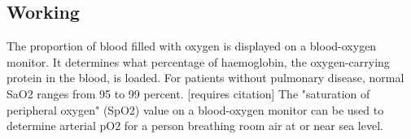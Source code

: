 \documentclass[12pt]{article}
\begin{document}
\subsection{Working}
The proportion of blood filled with oxygen is displayed on a blood-oxygen monitor. It determines what percentage of haemoglobin, the oxygen-carrying protein in the blood, is loaded. For patients without pulmonary disease, normal SaO2 ranges from 95 to 99 percent. [requires citation] The "saturation of peripheral oxygen" (SpO2) value on a blood-oxygen monitor can be used to determine arterial pO2 for a person breathing room air at or near sea level.
\end{document}
